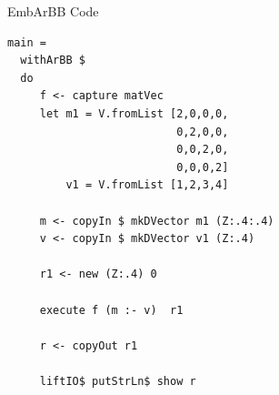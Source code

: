 \documentclass[xcolor=dvipsnames]{beamer}
\begin{document}
\begin{frame}[fragile]{EmbArBB Code} 

\begin{block}{}
\Fontvi
\begin{verbatim}
main =  
  withArBB $ 
  do 
     f <- capture matVec  
     let m1 = V.fromList [2,0,0,0,
                          0,2,0,0,
                          0,0,2,0,
                          0,0,0,2]
         v1 = V.fromList [1,2,3,4] 
     
     m <- copyIn $ mkDVector m1 (Z:.4:.4) 
     v <- copyIn $ mkDVector v1 (Z:.4) 

     r1 <- new (Z:.4) 0 

     execute f (m :- v)  r1
              
     r <- copyOut r1
              
     liftIO$ putStrLn$ show r
\end{verbatim} 
\end{block} 

\end{frame} 
\end{document}
